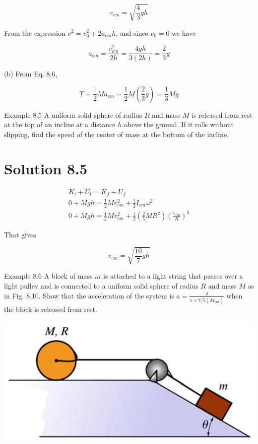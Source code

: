 \documentclass[10pt]{article}
\begin{document}
$$
v_{c m}=\sqrt{\frac{4}{3} g h}
$$

From the expression $v^{2}=v_{0}^{2}+2 a_{c m} h$, and since $v_{0}=0$ we have

$$
a_{c m}=\frac{v_{c m}^{2}}{2 h}=\frac{4 g h}{3(2 h)}=\frac{2}{3} g
$$

(b) From Eq. 8.6,

$$
T=\frac{1}{2} M a_{c m}=\frac{1}{2} M\left(\frac{2}{3} g\right)=\frac{1}{3} M g
$$

Example 8.5 A uniform solid sphere of radius $R$ and mass $M$ is released from rest at the top of an incline at a distance $h$ above the ground. If it rolls without slipping, find the speed of the center of mass at the bottom of the incline.

\section*{Solution 8.5}
$$
\begin{gathered}
K_{i}+U_{i}=K_{f}+U_{f} \\
0+M g h=\frac{1}{2} M v_{c m}^{2}+\frac{1}{2} I_{c m} \omega^{2} \\
0+M g h=\frac{1}{2} M v_{c m}^{2}+\frac{1}{2}\left(\frac{2}{5} M R^{2}\right)\left(\frac{v_{c m}}{R}\right)^{2}
\end{gathered}
$$

That gives

$$
v_{c m}=\sqrt{\frac{10}{7} g h}
$$

Example 8.6 A block of mass $m$ is attached to a light string that passes over a light pulley and is connected to a uniform solid sphere of radius $R$ and mass $M$ as in Fig. 8.10. Show that the acceleration of the system is $a=\frac{g}{1+7 / 5\left(M_{/ m}\right)}$ when the block is released from rest.

\begin{center}
\includegraphics[max width=\textwidth]{2024_09_13_db1f357d2aad0a03eb2eg-135}
\end{center}
\end{document}

